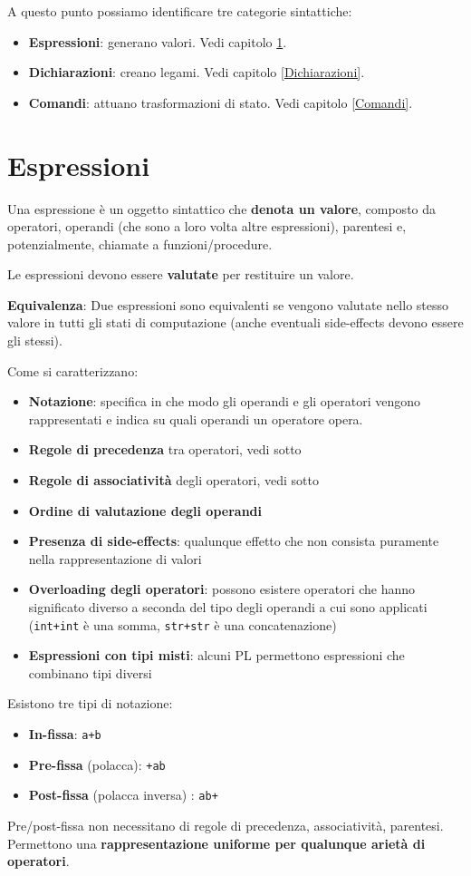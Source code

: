 \documentclass[12pt,a4paper]{article}
\begin{document}
A questo punto possiamo identificare tre categorie sintattiche:
\begin{itemize}
\item \textbf{Espressioni}: generano valori. Vedi capitolo \ref{Espressioni}.
\item \textbf{Dichiarazioni}: creano legami. Vedi capitolo \ref{Dichiarazioni}.
\item \textbf{Comandi}: attuano trasformazioni di stato. Vedi capitolo \ref{Comandi}.
\end{itemize}
\clearpage
\section{Espressioni} \label{Espressioni}
Una espressione è un oggetto sintattico che \textbf{denota un valore}, composto da operatori, operandi (che sono a loro volta altre espressioni), parentesi e, potenzialmente, chiamate a funzioni\slash procedure.

Le espressioni devono essere \textbf{valutate} per restituire un valore.

\textbf{Equivalenza}: Due espressioni sono equivalenti se vengono valutate nello stesso valore in tutti gli stati di computazione (anche eventuali side-effects devono essere gli stessi).

Come si caratterizzano:
\begin{itemize}
\item \textbf{Notazione}: specifica in che modo gli operandi e gli operatori vengono rappresentati e indica su quali operandi un operatore opera.
\item \textbf{Regole di precedenza} tra operatori, vedi sotto
\item \textbf{Regole di associatività} degli operatori, vedi sotto
\item \textbf{Ordine di valutazione degli operandi}
\item \textbf{Presenza di side-effects}: qualunque effetto che non consista puramente nella rappresentazione di valori
\item \textbf{Overloading degli operatori}: possono esistere operatori che hanno significato diverso a seconda del tipo degli operandi a cui sono applicati (\texttt{int+int} è una somma, \texttt{str+str} è una concatenazione)
\item \textbf{Espressioni con tipi misti}: alcuni PL permettono espressioni che combinano tipi diversi
\end{itemize}
Esistono tre tipi di notazione:
\begin{itemize}
\item \textbf{In-fissa}: \texttt{a+b}
\item \textbf{Pre-fissa} (polacca): \texttt{+ab}
\item \textbf{Post-fissa} (polacca inversa) : \texttt{ab+}
\end{itemize}
Pre\slash post-fissa non necessitano di regole di precedenza, associatività, parentesi. Permettono una \textbf{rappresentazione uniforme per qualunque arietà di operatori}.
\end{document}
